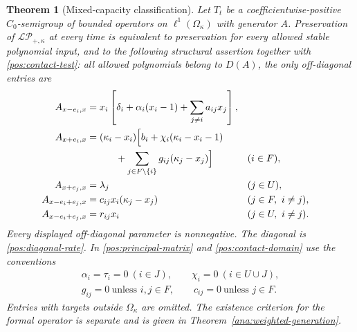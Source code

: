 \documentclass[reqno]{amsart}
\newtheorem{theorem}{Theorem}[section]
\theoremstyle{definition}
\theoremstyle{remark}
\begin{document}
\begin{theorem}[Mixed-capacity classification]\label{pos:mixed}
Let \(T_t\) be a coefficientwise-positive \(C_0\)-semigroup of bounded operators
on \(\ell^1(\Omega_\kappa)\) with generator \(A\).
Preservation of \(\mathcal{LP}_{+,\kappa}\) at every time is equivalent to
preservation for every allowed stable polynomial input, and to the following
structural assertion together with \eqref{pos:contact-test}:
all allowed polynomials belong to \(D(A)\), the only off-diagonal entries are
\begin{equation}\label{pos:mixed-rates}
\begin{aligned}
 A_{x-e_i,x}&=x_i\left[\delta_i+\alpha_i(x_i-1)+\sum_{j\ne i}a_{ij}x_j\right],\\
 A_{x+e_i,x}&=(\kappa_i-x_i)\Bigl[b_i+\chi_i(\kappa_i-x_i-1)\\
 &\hspace{3em}+\sum_{j\in F\setminus\{i\}}g_{ij}(\kappa_j-x_j)\Bigr] &&(i\in F),\\
 A_{x+e_j,x}&=\lambda_j &&(j\in U),\\
 A_{x-e_i+e_j,x}&=c_{ij}x_i(\kappa_j-x_j) &&(j\in F,\ i\ne j),\\
 A_{x-e_i+e_j,x}&=r_{ij}x_i &&(j\in U,\ i\ne j).
\end{aligned}
\end{equation}
Every displayed off-diagonal parameter is nonnegative.  The diagonal is
\eqref{pos:diagonal-rate}.  In \eqref{pos:principal-matrix} and
\eqref{pos:contact-domain} use the conventions
\[
 \begin{gathered}
 \alpha_i=\tau_i=0\ (i\in J),\qquad
 \chi_i=0\ (i\in U\cup J),\\
 g_{ij}=0\ \text{unless }i,j\in F,\qquad
 c_{ij}=0\ \text{unless }j\in F.
 \end{gathered}
\]
Entries with targets outside \(\Omega_\kappa\) are omitted.
The existence criterion for the formal operator is separate and is given in
Theorem~\ref{ana:weighted-generation}.
\end{theorem}
\end{document}
